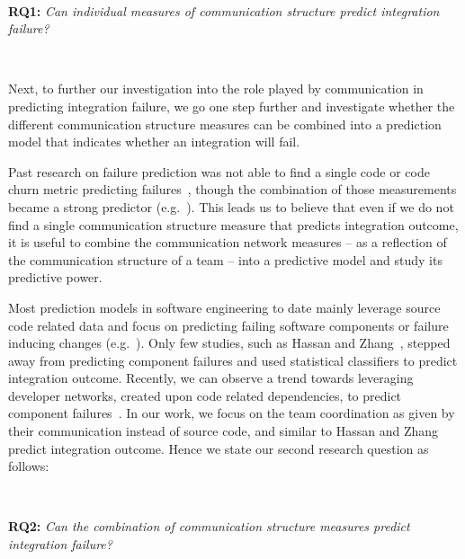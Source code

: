\documentclass[12pt,oneside]{book}
\begin{document}
\ \

\noindent\textbf{RQ1:} \emph{Can individual measures of communication structure
predict integration failure?}

\ \

Next, to further our investigation into the role played by communication in
predicting integration failure, we go one step further and investigate whether
the different communication structure measures can be combined into a prediction
model that indicates whether an integration will fail.

Past research on failure prediction was not able to find a single code or code
churn metric predicting
failures~\cite{nagappan:icse:2006,basili:1996tse,denaro:2002seke}, though the
combination of those measurements became a strong predictor
(e.g.~\cite{mockus:2000bell}). This leads us to believe that even if we do not
find a single communication structure measure that predicts integration outcome,
it is useful to combine the communication network measures -- as a reflection of
the communication structure of a team -- into a predictive model and study its
predictive power.

Most prediction models in software engineering to date mainly leverage source
code related data and focus on predicting failing software components or failure
inducing changes
(e.g.~\cite{bell:2005tse,schroeter:isese:2006,zimmermann:icse:2008,kim:2008tse}).
Only few studies, such as Hassan and Zhang~\cite{hassan:ase:2006}, stepped away
from predicting component failures and used statistical classifiers to predict
integration outcome. Recently, we can observe a trend towards leveraging
developer networks, created upon code related dependencies, to predict component
failures~\cite{pinzger:fse:2008,fse08:meneely}. In our work, we focus on the
team coordination as given by their communication instead of source code, and
similar to Hassan and Zhang predict integration outcome. Hence we state our
second research question as follows:

\ \

\noindent\textbf{RQ2:} \emph{Can the combination of communication structure
measures predict integration failure?}

\end{document}
